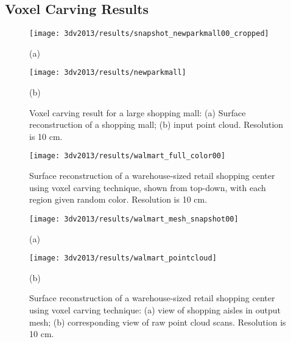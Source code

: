 \documentclass[12pt,onecolumn,oneside]{book}
\begin{document}
\FloatBarrier
\subsection{Voxel Carving Results}
\label{ssec:3dv2013_results}


\begin{figure}[t]
	\begin{minipage}[t]{0.99\linewidth}
	\centerline{\texttt{[image: 3dv2013/results/snapshot\_newparkmall00\_cropped]}}
	\centerline{(a)}
	\end{minipage}
	\hfill
	\begin{minipage}[t]{0.99\linewidth}
	\centerline{\texttt{[image: 3dv2013/results/newparkmall]}}
	\centerline{(b)}
	\end{minipage}
	\caption[Voxel carving result for a large shopping mall.]{Voxel carving result for a large shopping mall:  (a) Surface reconstruction of a shopping mall; (b) input point cloud.  Resolution is 10 cm.}
	\label{fig:3dv2013_newparkmall}
\end{figure}

\begin{figure}[p]
	\begin{minipage}[b]{0.98\linewidth}
	\centerline{\texttt{[image: 3dv2013/results/walmart\_full\_color00]}}
	\end{minipage}
	\caption[Voxel carving of warehouse-sized retail center, top-down.]{Surface reconstruction of a warehouse-sized retail shopping center using voxel carving technique, shown from top-down, with each region given random color. Resolution is 10 cm.}
	\label{fig:3dv2013_walmart_part1}
\end{figure}

\begin{figure}[p]
	\begin{minipage}[b]{0.98\linewidth}
	\centerline{\texttt{[image: 3dv2013/results/walmart\_mesh\_snapshot00]}}
	\centerline{(a)}
	\end{minipage}
	\hfill
	\begin{minipage}[b]{0.98\linewidth}
	\centerline{\texttt{[image: 3dv2013/results/walmart\_pointcloud]}}
	\centerline{(b)}
	\end{minipage}
	\caption[Voxel carving of warehouse-sized retail center, side view.]{Surface reconstruction of a warehouse-sized retail shopping center using voxel carving technique:  (a) view of shopping aisles in output mesh; (b) corresponding view of raw point cloud scans.  Resolution is 10 cm.}
	\label{fig:3dv2013_walmart_part2}
\end{figure}
\end{document}
